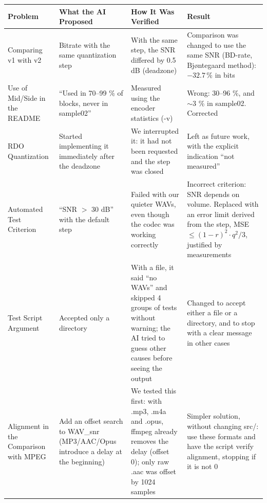 \begin{table}[H]
\centering
\small
\begin{tabularx}{\textwidth}{@{}p{}p{}p{}X@{}}
\toprule
\textbf{Problem} &
\textbf{What the AI Proposed} &
\textbf{How It Was Verified} &
\textbf{Result} \\
\midrule

Comparing v1 with v2 &
Bitrate with the same quantization step &
With the same step, the SNR differed by 0.5 dB (deadzone) &
Comparison was changed to use the same SNR (BD-rate, Bjøntegaard
method): $-32.7\,\%$ in bits \\

\midrule

Use of Mid/Side in the README &
``Used in 70--99 \% of blocks, never in sample02'' &
Measured using the encoder statistics (-v) &
Wrong: 30--96 \%, and $\sim$3 \% in sample02. Corrected \\

\midrule

RDO Quantization &
Started implementing it immediately after the deadzone &
We interrupted it: it had not been requested and the step was closed &
Left as future work, with the explicit indication ``not measured'' \\

\midrule

Automated Test Criterion &
``SNR $>$ 30 dB'' with the default step &
Failed with our quieter WAVs, even though the codec was working
correctly &
Incorrect criterion: SNR depends on volume. Replaced with an error
limit derived from the step, MSE $\leq (1-r)^2 \cdot q^2/3$,
justified by measurements \\

\midrule

Test Script Argument &
Accepted only a directory &
With a file, it said ``no WAVs'' and skipped 4 groups of tests
without warning; the AI tried to guess other causes before seeing
the output &
Changed to accept either a file or a directory, and to stop with
a clear message in other cases \\

\midrule

Alignment in the Comparison with MPEG &
Add an offset search to WAV\_snr (MP3/AAC/Opus introduce a delay
at the beginning) &
We tested this first: with .mp3, .m4a and .opus, ffmpeg already
removes the delay (offset 0); only raw .aac was offset by
1024 samples &
Simpler solution, without changing src/: use these formats and
have the script verify alignment, stopping if it is not 0 \\

\bottomrule
\end{tabularx}
\end{table}

